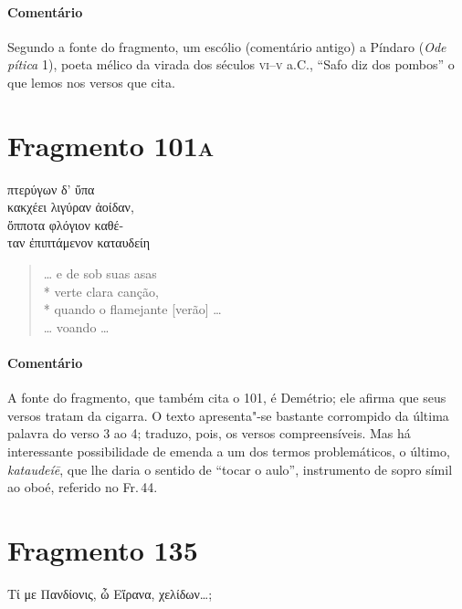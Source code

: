 \medskip

{\paragraph{Comentário} Segundo a fonte do fragmento, um escólio (comentário antigo) a Píndaro
(\textit{Ode pítica} 1), poeta mélico da virada dos séculos \textsc{vi}--\textsc{v} a.C.,
``Safo diz dos pombos'' o que lemos nos versos que cita.}


\section{Fragmento 101\textsc{a}}

\begin{gkverse}
πτερύγων δ’ ὔπα\\
κακχέει λιγύραν ἀοίδαν,\\
ὄπποτα φλόγιον \dagger{}καθέ-\\
ταν\dagger{} ἐπιπτάμενον \dagger{}καταυδείη\dagger{}
\end{gkverse}

\begin{verse}
\ldots{} e de sob suas asas\\*
verte clara canção,\\*
quando o flamejante [verão] \ldots{}\\
\ldots{} voando \ldots{}
\end{verse}

\medskip

{\paragraph{Comentário} A fonte do fragmento, que também cita o 101, é Demétrio; ele afirma que seus versos tratam da cigarra. O texto apresenta"-se bastante corrompido da última palavra do verso 3 ao 4; traduzo, pois, os versos compreensíveis. Mas há interessante possibilidade de emenda a um dos termos problemáticos, o último, \textit{kataudeíē}, que lhe daria o sentido de ``tocar o aulo'', instrumento de sopro símil ao oboé, referido no Fr.\,44.}



\pagebreak
\section{Fragmento 135}

\begin{gkverse}
Τί με Πανδίονις, ὦ Εἴρανα, χελίδων\ldots{};
\end{gkverse}

